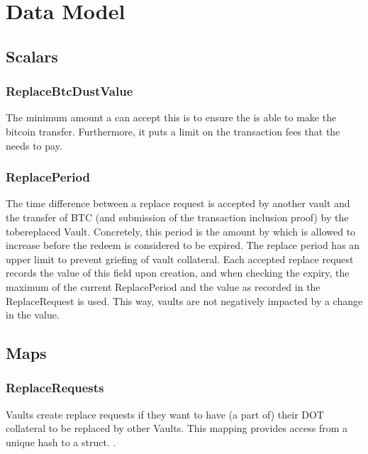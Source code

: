 \documentclass[a4paper,10pt,english]{sphinxmanual}
\begin{document}
\section{Data Model}
\label{\detokenize{spec/replace:data-model}}

\subsection{Scalars}
\label{\detokenize{spec/replace:scalars}}

\subsubsection{ReplaceBtcDustValue}
\label{\detokenize{spec/replace:replacebtcdustvalue}}
The minimum amount a  can accept \sphinxhyphen{} this is to ensure the  is able to make the bitcoin transfer. Furthermore, it puts a limit on the transaction fees that the  needs to pay.


\subsubsection{ReplacePeriod}
\label{\detokenize{spec/replace:replaceperiod}}\label{\detokenize{spec/replace:id2}}
The time difference between a replace request is accepted by another vault and the transfer of BTC (and submission of the transaction inclusion proof) by the to\sphinxhyphen{}be\sphinxhyphen{}replaced Vault. Concretely, this period is the amount by which {\hyperref[\detokenize{spec/security:activeblockcount}]{}} is allowed to increase before the redeem is considered to be expired. The replace period has an upper limit to prevent griefing of vault collateral. Each accepted replace request records the value of this field upon creation, and when checking the expiry, the maximum of the current ReplacePeriod and the value as recorded in the ReplaceRequest is used. This way, vaults are not negatively impacted by a change in the value.


\subsection{Maps}
\label{\detokenize{spec/replace:maps}}

\subsubsection{ReplaceRequests}
\label{\detokenize{spec/replace:replacerequests}}
Vaults create replace requests if they want to have (a part of) their DOT collateral to be replaced by other Vaults. This mapping provides access from a unique hash  to a  struct. .
\end{document}
